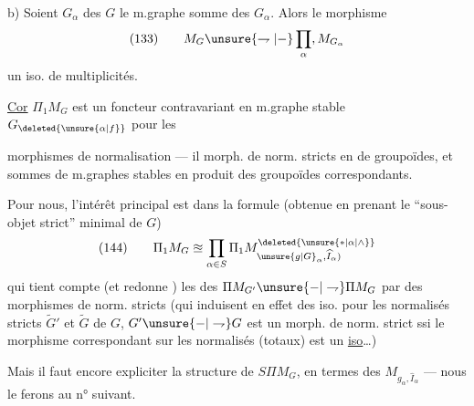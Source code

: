 b) Soient $G_\alpha$ des   $G$ le m.graphe somme des $G_\alpha$. Alors\unsure{:|,} le morphisme
\[
(133)\qquad M_G\unsure{\rightharpoondown|{-}}\prod_\alpha, M_{G_\alpha}
\]
 un iso. de multiplicités.

\uline{Cor} $\Pi_1M_G$ est un foncteur contravariant en  m.graphe stable $G_{\deleted{\unsure{\alpha|f}}}$ pour les

morphismes de normalisation — il  morph. de norm. stricts en  de groupoïdes, et sommes de m.graphes stables en produit des groupoïdes correspondants.

Pour nous, l'intérêt principal est dans la formule (obtenue en prenant le ``sous-objet strict'' minimal de $G$)
\[
(144)\qquad \Pi_1M_G\approxeq\prod_{\alpha\in S}\Pi_1M_{\unsure{g|G}_\alpha,\widehat I_\alpha)}^{\deleted{\unsure{*|\alpha|\wedge}}}
\]
qui tient compte  (et redonne ) les  des $\Pi M_{G'}\unsure{-|\rightharpoondown}\Pi M_G$ par des morphismes de norm. stricts (qui induisent en effet des iso. pour les normalisés stricts $\widetilde G'$ et $\widetilde G$ de $G$,
$G'\unsure{-|\rightharpoondown}G$ est un morph. de norm. strict ssi le morphisme correspondant sur les normalisés (totaux) est un \uline{iso}\ldots)

Mais il faut encore expliciter la structure de $S\Pi M_G$, en termes des $M_{g_\alpha,\widehat I_\alpha}$ — nous le ferons au n° suivant.

